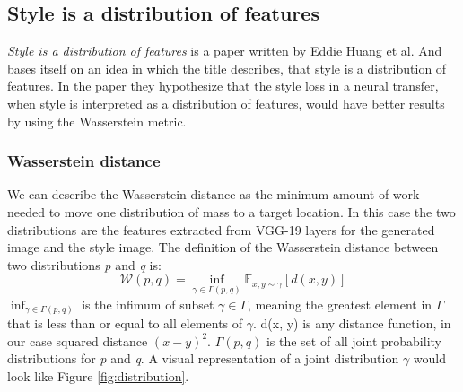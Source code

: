 \subsection{Style is a distribution of features}
\label{sec:Style is a distribution of features}
\textit{Style is a distribution of features} is a paper written by Eddie Huang et al. \cite{Huang:2} And bases itself on an idea in which the title describes, that style is a distribution of features. In the paper they hypothesize that the style loss in a neural transfer, when style is interpreted as a distribution of features,  would have better results by using the Wasserstein metric.
\subsubsection{Wasserstein distance}
We can describe the Wasserstein distance as the minimum amount of work needed to move one distribution of mass to a target location. In this case the two distributions are the features extracted from VGG-19 layers for the generated image and the style image.\newline
The definition of the Wasserstein distance between two distributions \textit{p} and \textit{q} is: \newline
\begin{equation}
\mathcal{W}(p, q) = \inf_{\gamma \in \Gamma(p, q)} \mathbb{E}_{x, y\sim\gamma}[d(x, y)]
\end{equation}
\newline
$ \inf_{\gamma \in \Gamma(p, q)}$ is the infimum of subset $\gamma\in\Gamma$, meaning the greatest element in $\Gamma$ that is less than or equal to all elements of $\gamma$. d(x, y) is any distance function, in our case squared distance $(x - y)^2$. $\Gamma(p, q)$ is the set of all joint probability distributions for \textit{p} and \textit{q}. A visual representation of a joint distribution $\gamma$ would look like Figure \ref{fig:distribution}.
